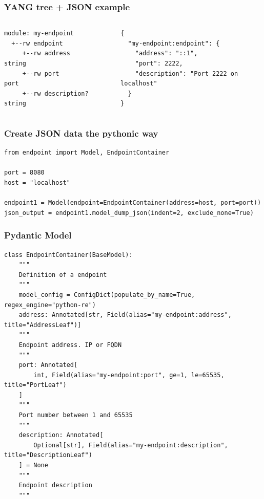 \documentclass[aspectratio=169]{beamer}
\begin{document}
\begin{frame}[fragile]
  \frametitle{YANG tree + JSON example}

  \begin{columns}
        \begin{verbatim}
module: my-endpoint
  +--rw endpoint
     +--rw address        string
     +--rw port           port
     +--rw description?   string
\end{verbatim}
        \begin{verbatim}
{
  "my-endpoint:endpoint": {
    "address": "::1",
    "port": 2222,
    "description": "Port 2222 on localhost"
  }
}
\end{verbatim}
    \end{columns}
\end{frame}


\begin{frame}[fragile]
  \frametitle{Create JSON data the pythonic way}

        \begin{verbatim}
from endpoint import Model, EndpointContainer

port = 8080
host = "localhost"

endpoint1 = Model(endpoint=EndpointContainer(address=host, port=port))
json_output = endpoint1.model_dump_json(indent=2, exclude_none=True)
\end{verbatim}

\end{frame}

\begin{frame}[fragile]
  \frametitle{Pydantic Model}

        \begin{verbatim}
class EndpointContainer(BaseModel):
    """
    Definition of a endpoint
    """
    model_config = ConfigDict(populate_by_name=True, regex_engine="python-re")
    address: Annotated[str, Field(alias="my-endpoint:address", title="AddressLeaf")]
    """
    Endpoint address. IP or FQDN
    """
    port: Annotated[
        int, Field(alias="my-endpoint:port", ge=1, le=65535, title="PortLeaf")
    ]
    """
    Port number between 1 and 65535
    """
    description: Annotated[
        Optional[str], Field(alias="my-endpoint:description", title="DescriptionLeaf")
    ] = None
    """
    Endpoint description
    """
\end{verbatim}

\end{frame}
\end{document}
